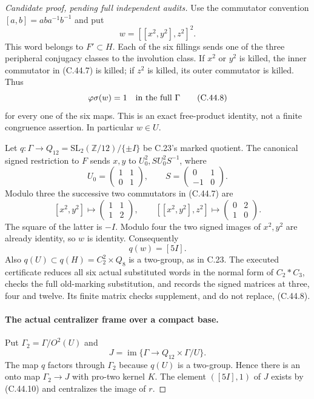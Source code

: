 \begin{proof}[Candidate proof, pending full independent audits]
Use the commutator convention $[a,b]=aba^{-1}b^{-1}$ and put
\[
                         w=[[x^2,y^2],z^2]^2.          \tag{C.44.7}
\]
This word belongs to $F'\subset H$. Each of the six fillings
sends one of the three peripheral conjugacy classes to the
involution class. If $x^2$ or $y^2$ is killed, the inner
commutator in (C.44.7) is killed; if $z^2$ is killed, its
outer commutator is killed. Thus
\[
                       \varphi\sigma(w)=1
               \quad\hbox{in the full }\Gamma          \tag{C.44.8}
\]
for every one of the six maps. This is an exact free-product
identity, not a finite congruence assertion. In particular $w\in U$.

Let $q:\Gamma\to Q_{12}=\mathrm{SL}_2(\mathbb Z/12)/\{\pm I\}$
be C.23's marked quotient. The canonical signed restriction to
$F$ sends $x,y$ to $U_0^2,SU_0^2S^{-1}$, where
\[
 U_0=\begin{pmatrix}1&1\\0&1\end{pmatrix},\qquad
 S=\begin{pmatrix}0&1\\-1&0\end{pmatrix}.
\]
Modulo three the successive two commutators in (C.44.7) are
\[
 [x^2,y^2]\longmapsto\begin{pmatrix}1&1\\1&2\end{pmatrix},
 \qquad
 [[x^2,y^2],z^2]\longmapsto\begin{pmatrix}0&2\\1&0\end{pmatrix}.
                                                               \tag{C.44.9}
\]
The square of the latter is $-I$. Modulo four the two signed
images of $x^2,y^2$ are already identity, so $w$ is identity.
Consequently
\[
                         q(w)=[5I].                   \tag{C.44.10}
\]
Also $q(U)\subset q(H)=C_2^2\times Q_8$ is a two-group,
as in C.23. The executed certificate
reduces all six actual substituted words in the normal form of
$C_2*C_3$, checks the full old-marking substitution, and records
the signed matrices at three, four and twelve. Its finite matrix
checks supplement, and do not replace, (C.44.8).

\paragraph{The actual centralizer frame over a compact base.}
Put $\Gamma_2=\Gamma/O^2(U)$ and
\[
 J=\operatorname{im}\{\Gamma\to Q_{12}\times\Gamma/U\}.
\]
The map $q$ factors through $\Gamma_2$ because $q(U)$ is a
two-group. Hence there is an onto map $\Gamma_2\to J$ with
pro-two kernel $K$. The element $([5I],1)$ of $J$ exists by
(C.44.10) and centralizes the image of $r$.


\end{proof}
